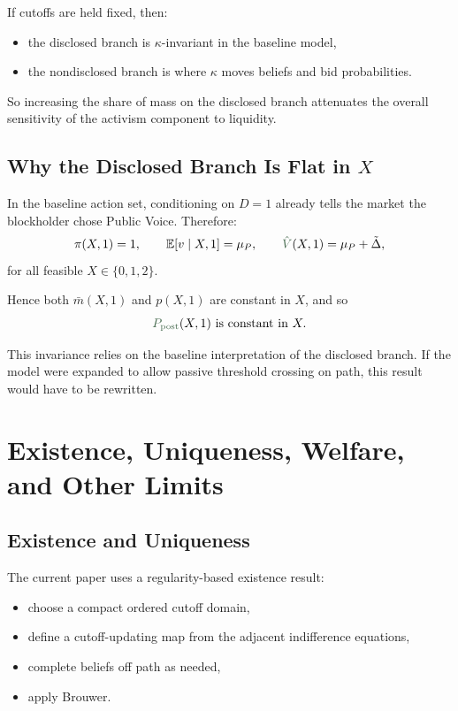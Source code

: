 \documentclass[11pt,a4paper]{article}
\theoremstyle{definition}
\theoremstyle{plain}
\theoremstyle{remark}
\newcommand{\E}{\mathbb{E}}
\newcommand{\1}{\mathbf{1}}
\newcommand{\outcome}[1]{{\color{ForestGreen!50!black}#1}}
\begin{document}
If cutoffs are held fixed, then:
\begin{itemize}
\item the disclosed branch is $\kappa$-invariant in the baseline model,
\item the nondisclosed branch is where $\kappa$ moves beliefs and bid probabilities.
\end{itemize}

So increasing the share of mass on the disclosed branch attenuates the overall sensitivity of the activism component to liquidity.

\subsection{Why the Disclosed Branch Is Flat in \texorpdfstring{$X$}{X}}

In the baseline action set, conditioning on $D=1$ already tells the market the blockholder chose Public Voice. Therefore:
\begin{equation}
\pi(X,1)=1,
\qquad
\E[v\mid X,1]=\mu_P,
\qquad
\outcome{\hat V}(X,1)=\mu_P+\tilde{\Delta},
\label{eq:disclosed-constants}
\end{equation}
for all feasible $X\in\{0,1,2\}$.

Hence both $\bar m(X,1)$ and $p(X,1)$ are constant in $X$, and so
\begin{equation}
\outcome{P_{\textup{post}}}(X,1)
\text{ is constant in } X.
\label{eq:ppost-flat}
\end{equation}

\begin{warningbox}
This invariance relies on the baseline interpretation of the disclosed branch. If the model were expanded to allow passive threshold crossing on path, this result would have to be rewritten.
\end{warningbox}

\section{Existence, Uniqueness, Welfare, and Other Limits}

\subsection{Existence and Uniqueness}

The current paper uses a regularity-based existence result:
\begin{itemize}
\item choose a compact ordered cutoff domain,
\item define a cutoff-updating map from the adjacent indifference equations,
\item complete beliefs off path as needed,
\item apply Brouwer.
\end{itemize}
\end{document}
